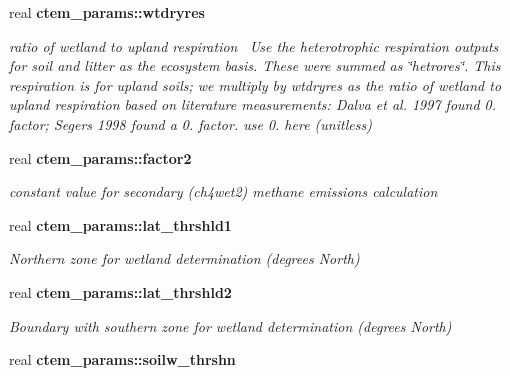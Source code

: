 \begin{DoxyCompactItemize}
\item 
\hypertarget{namespacectem__params_a71227aca2a1e2963319a981847fa2874}{}real {\bfseries ctem\+\_\+params\+::wtdryres}\label{namespacectem__params_a71227aca2a1e2963319a981847fa2874}

\begin{DoxyCompactList}\small\item\em ratio of wetland to upland respiration~\newline
Use the heterotrophic respiration outputs for soil and litter as the ecosystem basis. These were summed as \char`\"{}hetrores\char`\"{}. This respiration is for upland soils; we multiply by wtdryres as the ratio of wetland to upland respiration based on literature measurements\+: Dalva et al. 1997 found 0. factor; Segers 1998 found a 0. factor. use 0. here (unitless) \end{DoxyCompactList}\item 
\hypertarget{namespacectem__params_aba1c91ff7281b9069ec03e8ecc581fef}{}real {\bfseries ctem\+\_\+params\+::factor2}\label{namespacectem__params_aba1c91ff7281b9069ec03e8ecc581fef}

\begin{DoxyCompactList}\small\item\em constant value for secondary (ch4wet2) methane emissions calculation \end{DoxyCompactList}\item 
\hypertarget{namespacectem__params_a3a63b83e7f97702b648861ae4a586b59}{}real {\bfseries ctem\+\_\+params\+::lat\+\_\+thrshld1}\label{namespacectem__params_a3a63b83e7f97702b648861ae4a586b59}

\begin{DoxyCompactList}\small\item\em Northern zone for wetland determination (degrees North) \end{DoxyCompactList}\item 
\hypertarget{namespacectem__params_ac0a149191207794d3a3867a93efc5757}{}real {\bfseries ctem\+\_\+params\+::lat\+\_\+thrshld2}\label{namespacectem__params_ac0a149191207794d3a3867a93efc5757}

\begin{DoxyCompactList}\small\item\em Boundary with southern zone for wetland determination (degrees North) \end{DoxyCompactList}\item 
\hypertarget{namespacectem__params_ab4795b61fccde1fc82638b5f8b9624aa}{}real {\bfseries ctem\+\_\+params\+::soilw\+\_\+thrshn}\label{namespacectem__params_ab4795b61fccde1fc82638b5f8b9624aa}


\end{DoxyCompactItemize}
